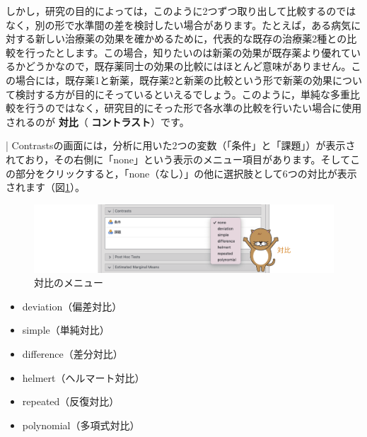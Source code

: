\documentclass[
  12pt,
  a5jpaper,
  lualatex, ja=standard]{bxjsbook}
\providecommand{\tightlist}{%
  \setlength{\itemsep}{0pt}\setlength{\parskip}{0pt}}
\renewcommand{\emph}[1]{\textbf{\color{emph} #1}}
\newenvironment{jmvsettings}{%
	\begin{center}%
	\begin{tcolorbox}[%
		title=設定項目,
		colframe=gmoji,
		colbacktitle=gmoji,
		colback=gmoji!2!white,
		breakable,
		width=.9\textwidth,
		]\small\addtolength{\leftmargini}{-3\labelsep}%
	}%
	{\end{tcolorbox}\end{center}}
\begin{document}
しかし，研究の目的によっては，このように2つずつ取り出して比較するのではなく，別の形で水準間の差を検討したい場合があります。たとえば，ある病気に対する新しい治療薬の効果を確かめるために，代表的な既存の治療薬2種との比較を行ったとします。この場合，知りたいのは新薬の効果が既存薬より優れているかどうかなので，既存薬同士の効果の比較にはほとんど意味がありません。この場合には，既存薬1と新薬，既存薬2と新薬の比較という形で新薬の効果について検討する方が目的にそっているといえるでしょう。このように，単純な多重比較を行うのではなく，研究目的にそった形で各水準の比較を行いたい場合に使用されるのが\emph{対比}（\emph{コントラスト}）です。

\colorbox{bar}{\textcolor{gmoji2}{| Contrasts}}の画面には，分析に用いた2つの変数（「条件」と「課題」）が表示されており，その右側に「none」という表示のメニュー項目があります。そしてこの部分をクリックすると，「none（なし）」の他に選択肢として6つの対比が表示されます（図\ref{fig:ANOVA-anova-contrasts-popup}）。

\begin{figure}[!ht]

{\centering \includegraphics[width=1\linewidth]{images/ANOVA/anova-contrasts-popup} 

}

\caption{対比のメニュー}\label{fig:ANOVA-anova-contrasts-popup}
\end{figure}

\begin{jmvsettings}

\begin{itemize}
\tightlist
\item
  deviation（偏差対比）　
\item
  simple（単純対比）
\item
  difference（差分対比）
\item
  helmert（ヘルマート対比）
\item
  repeated（反復対比）
\item
  polynomial（多項式対比）
\end{itemize}

\end{jmvsettings}
\end{document}
